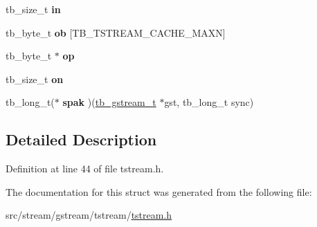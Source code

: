 \begin{DoxyCompactItemize}
\item 
\hypertarget{structtb__tstream__t_a2a04266da4cf984c4505eba51fd0642b}{tb\-\_\-size\-\_\-t {\bfseries in}}\label{da/d93/structtb__tstream__t_a2a04266da4cf984c4505eba51fd0642b}

\item 
\hypertarget{structtb__tstream__t_a708c3b1134a26d12f65c7ec31b9fa671}{tb\-\_\-byte\-\_\-t {\bfseries ob} \mbox{[}T\-B\-\_\-\-T\-S\-T\-R\-E\-A\-M\-\_\-\-C\-A\-C\-H\-E\-\_\-\-M\-A\-X\-N\mbox{]}}\label{da/d93/structtb__tstream__t_a708c3b1134a26d12f65c7ec31b9fa671}

\item 
\hypertarget{structtb__tstream__t_a1a16e8f235a0c7f4e6bce4590b4082f5}{tb\-\_\-byte\-\_\-t $\ast$ {\bfseries op}}\label{da/d93/structtb__tstream__t_a1a16e8f235a0c7f4e6bce4590b4082f5}

\item 
\hypertarget{structtb__tstream__t_af8b1d81f191d777faf45e6da4f651cd0}{tb\-\_\-size\-\_\-t {\bfseries on}}\label{da/d93/structtb__tstream__t_af8b1d81f191d777faf45e6da4f651cd0}

\item 
\hypertarget{structtb__tstream__t_a2ba6704b4bd08329a23cb0c3120dd8dc}{tb\-\_\-long\-\_\-t($\ast$ {\bfseries spak} )(\hyperlink{structtb__gstream__t}{tb\-\_\-gstream\-\_\-t} $\ast$gst, tb\-\_\-long\-\_\-t sync)}\label{da/d93/structtb__tstream__t_a2ba6704b4bd08329a23cb0c3120dd8dc}

\end{DoxyCompactItemize}


\subsection{Detailed Description}


Definition at line 44 of file tstream.\-h.



The documentation for this struct was generated from the following file\-:\begin{DoxyCompactItemize}
\item 
src/stream/gstream/tstream/\hyperlink{tstream_8h}{tstream.\-h}\end{DoxyCompactItemize}
